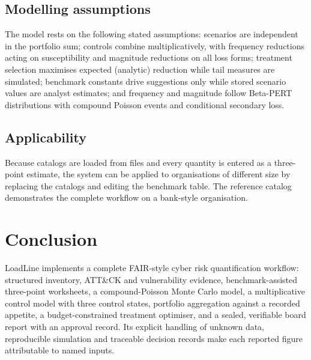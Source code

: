 \documentclass[11pt,a4paper]{article}
\begin{document}
\subsection{Modelling assumptions}
The model rests on the following stated assumptions: scenarios are independent in the portfolio sum; controls combine multiplicatively, with frequency reductions acting on susceptibility and magnitude reductions on all loss forms; treatment selection maximises expected (analytic) reduction while tail measures are simulated; benchmark constants drive suggestions only while stored scenario values are analyst estimates; and frequency and magnitude follow Beta-PERT distributions with compound Poisson events and conditional secondary loss.

\subsection{Applicability}
Because catalogs are loaded from files and every quantity is entered as a three-point estimate, the system can be applied to organisations of different size by replacing the catalogs and editing the benchmark table. The reference catalog demonstrates the complete workflow on a bank-style organisation.

\section{Conclusion}
LoadLine implements a complete FAIR-style cyber risk quantification workflow: structured inventory, ATT\&CK and vulnerability evidence, benchmark-assisted three-point worksheets, a compound-Poisson Monte Carlo model, a multiplicative control model with three control states, portfolio aggregation against a recorded appetite, a budget-constrained treatment optimiser, and a sealed, verifiable board report with an approval record. Its explicit handling of unknown data, reproducible simulation and traceable decision records make each reported figure attributable to named inputs.

\appendix
\end{document}
